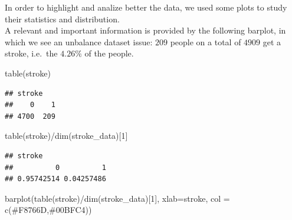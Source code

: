 \documentclass[
]{article}
\newenvironment{Shaded}{\begin{snugshade}}{\end{snugshade}}
\newcommand{\AttributeTok}[1]{\textcolor[rgb]{0.77,0.63,0.00}{#1}}
\newcommand{\DecValTok}[1]{\textcolor[rgb]{0.00,0.00,0.81}{#1}}
\newcommand{\FunctionTok}[1]{\textcolor[rgb]{0.00,0.00,0.00}{#1}}
\newcommand{\NormalTok}[1]{#1}
\newcommand{\SpecialCharTok}[1]{\textcolor[rgb]{0.00,0.00,0.00}{#1}}
\newcommand{\StringTok}[1]{\textcolor[rgb]{0.31,0.60,0.02}{#1}}
\begin{document}
In order to highlight and analize better the data, we used some plots to
study their statistics and distribution.\\
A relevant and important information is provided by the following
barplot, in which we see an unbalance dataset issue: \(209\) people on a
total of \(4909\) get a stroke, i.e.~the \(4.26 \%\) of the people.

\begin{Shaded}
\begin{Highlighting}[]
\FunctionTok{table}\NormalTok{(stroke)}
\end{Highlighting}
\end{Shaded}

\begin{verbatim}
## stroke
##    0    1 
## 4700  209
\end{verbatim}

\begin{Shaded}
\begin{Highlighting}[]
\FunctionTok{table}\NormalTok{(stroke)}\SpecialCharTok{/}\FunctionTok{dim}\NormalTok{(stroke\_data)[}\DecValTok{1}\NormalTok{]}
\end{Highlighting}
\end{Shaded}

\begin{verbatim}
## stroke
##          0          1 
## 0.95742514 0.04257486
\end{verbatim}

\begin{Shaded}
\begin{Highlighting}[]
\FunctionTok{barplot}\NormalTok{(}\FunctionTok{table}\NormalTok{(stroke)}\SpecialCharTok{/}\FunctionTok{dim}\NormalTok{(stroke\_data)[}\DecValTok{1}\NormalTok{], }\AttributeTok{xlab=}\StringTok{\textquotesingle{}stroke\textquotesingle{}}\NormalTok{,}
        \AttributeTok{col =} \FunctionTok{c}\NormalTok{(}\StringTok{\textquotesingle{}\#F8766D\textquotesingle{}}\NormalTok{,}\StringTok{\textquotesingle{}\#00BFC4\textquotesingle{}}\NormalTok{))}
\end{Highlighting}
\end{Shaded}
\end{document}
